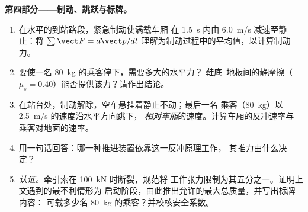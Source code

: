\begin{problem}
\medskip
\noindent\textbf{第四部分——制动、跳跃与标牌。}
\begin{enumerate}[resume]
  \item 在水平的到站路段，紧急制动使满载车厢
        在 \qty{1.5}{s} 内由 \qty{6.0}{m/s} 减速至静止：将 $\sum \vect F = d\vect p/dt$
        理解为制动过程中的平均值，以计算制动力。
  \item 要使一名 \qty{80}{kg} 的乘客停下，需要多大的水平力？
        鞋底–地板间的静摩擦（$\mu_s = 0.40$）能否提供该力？请作出结论。
  \item 在站台处，制动解除，空车悬挂着静止不动；最后一名
        乘客（\qty{80}{kg}）以 \qty{2.5}{m/s} 的速度沿水平方向跳下，
        \emph{相对车厢}的速度。计算车厢的反冲速率与
        乘客对地面的速率。
  \item 用一句话回答：哪一种推进装置依靠这一反冲原理工作，
        其推力由什么决定？
  \item \emph{认证。}牵引索在 \qty{100}{kN} 时断裂，规范将
        工作张力限制为其五分之一。证明上文遇到的最不利情形为
        启动阶段，由此推出允许的最大总质量，并写出标牌内容：
        可载多少名 \qty{80}{kg} 的乘客？并校核安全系数。
\end{enumerate}
\end{problem}
